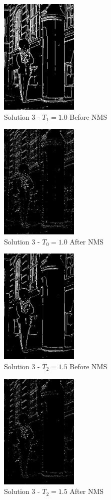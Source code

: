 \documentclass{article}
\begin{document}
\begin{figure}[!h]
  \centering
  \includegraphics[height=15em]{"code/outputs/prob3_b_1.jpg"}
  \caption{Solution 3 - $T_1 = 1.0$ Before NMS}
  \label{fig:s3b1-ori}
\end{figure}
\begin{figure}[!h]
  \centering
  \includegraphics[height=15em]{"code/outputs/prob3_b_nms1.jpg"}
  \caption{Solution 3 - $T_0 = 1.0$ After NMS}
  \label{fig:s3b1-ans}
\end{figure}
\begin{figure}[!h]
  \centering
  \includegraphics[height=15em]{"code/outputs/prob3_b_2.jpg"}
  \caption{Solution 3 - $T_2 = 1.5$ Before NMS}
  \label{fig:s3b2-ori}
\end{figure}
\begin{figure}[!h]
  \centering
  \includegraphics[height=15em]{"code/outputs/prob3_b_nms2.jpg"}
  \caption{Solution 3 - $T_2 = 1.5$ After NMS}
  \label{fig:s3b2-ans}
\end{figure}
\end{document}
